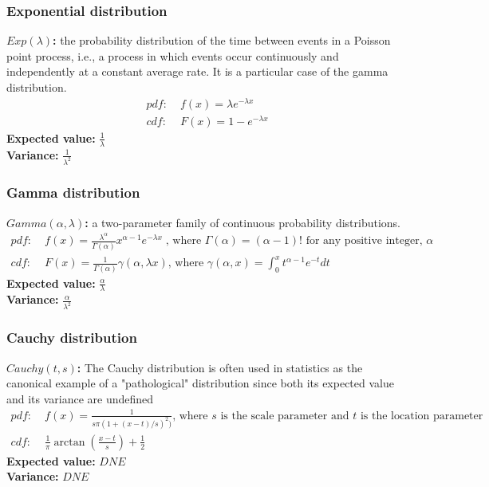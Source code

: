 \documentclass{article}
\begin{document}
\subsubsection{Exponential distribution}
\textbf{$Exp(\lambda)$:} the probability distribution of the time between events in a Poisson point process, i.e., a process in which events occur continuously and independently at a constant average rate. It is a particular case of the gamma distribution.
\begin{align*}
    pdf: & \; f(x) = \lambda e^{-\lambda x}\\
    cdf: & \; F(x) = 1 - e^{-\lambda x}
\end{align*}
\textbf{Expected value:} $\frac{1}{\lambda}$\\
\textbf{Variance:} $\frac{1}{\lambda^2}$

\subsubsection{Gamma distribution}
\textbf{$Gamma(\alpha, \lambda)$:} a two-parameter family of continuous probability distributions.
\begin{align*}
    pdf: & \; f(x) = \frac{\lambda^{\alpha}}{\Gamma(\alpha)}x^{\alpha-1} e^{-\lambda x} \; \textrm{, where } \Gamma(\alpha) = (\alpha - 1)! \textrm{ for any positive integer, } \alpha\\
    cdf: & \; F(x) =  \frac{1}{\Gamma(\alpha)}\gamma(\alpha, \lambda x) \textrm{, where } \gamma(\alpha, x) = \int_0^x t^{\alpha - 1}e^{-t}dt
\end{align*}
\textbf{Expected value:} $\frac{\alpha}{\lambda}$\\
\textbf{Variance:} $\frac{\alpha}{\lambda^2}$

\subsubsection{Cauchy distribution}
\textbf{$Cauchy(t, s)$:} The Cauchy distribution is often used in statistics as the canonical example of a "pathological" distribution since both its expected value and its variance are undefined
\begin{align*}
    pdf: & \; f(x) = \frac{1}{s \pi (1 + (x - t)/s)^2)} \textrm{, where } s \textrm{ is the scale parameter and } t \textrm{ is the location parameter}\\
    cdf: & \; \frac{1}{\pi} \arctan \left ( \frac{x - t}{s} \right ) + \frac{1}{2}
\end{align*}
\textbf{Expected value:} $DNE$\\
\textbf{Variance:} $DNE$
\end{document}
